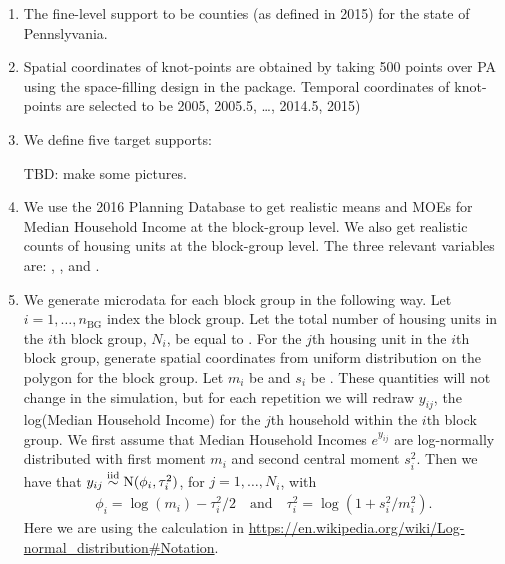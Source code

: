 \documentclass[12pt]{article}
\begin{document}
\begin{enumerate}
\item The fine-level support to be counties (as defined in 2015) for the state of Pennslyvania.

\item Spatial coordinates of knot-points are obtained by taking 500 points over PA using the space-filling design in the  package. Temporal coordinates of knot-points are selected to be 2005, 2005.5, \ldots, 2014.5, 2015)

\item We define five target supports:
%
TBD: make some pictures.

\item We use the 2016 Planning Database to get realistic means and MOEs for Median Household Income at the block-group level. We also get realistic counts of housing units at the block-group level. The three relevant variables are: , , and .

\item \label{step:means} We generate microdata for each block group in the following way. Let $i = 1, \ldots, n_\text{BG}$ index the block group. Let the total number of housing units in the $i$th block group, $N_i$, be equal to . For the $j$th housing unit in the $i$th block group, generate spatial coordinates from uniform distribution on the polygon for the block group. Let $m_i$ be  and $s_i$ be . These quantities will not change in the simulation, but for each repetition we will redraw $y_{ij}$, the log(Median Household Income) for the $j$th household within the $i$th block group. We first assume that Median Household Incomes $e^{y_{ij}}$ are log-normally distributed with first moment $m_i$ and second central moment $s_i^2$. Then we have that $y_{ij} \stackrel{\text{iid}}{\sim} \text{N}(\phi_i, \tau_i^2)$, for $j = 1, \ldots, N_i$, with
%
\begin{align*}
\phi_i = \log(m_i) - \tau_i^2 / 2
\quad \text{and} \quad
\tau_i^2 = \log(1 + s_i^2 / m_i^2).
\end{align*}
%
Here we are using the calculation in \url{https://en.wikipedia.org/wiki/Log-normal_distribution#Notation}.


\end{enumerate}
\end{document}
